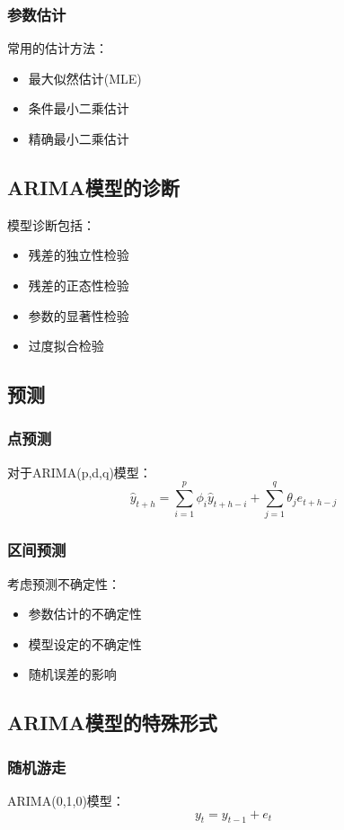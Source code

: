 \subsubsection{参数估计}
常用的估计方法：
\begin{itemize}
    \item 最大似然估计(MLE)
    \item 条件最小二乘估计
    \item 精确最小二乘估计
\end{itemize}

\subsection{ARIMA模型的诊断}
模型诊断包括：
\begin{itemize}
    \item 残差的独立性检验
    \item 残差的正态性检验
    \item 参数的显著性检验
    \item 过度拟合检验
\end{itemize}

\subsection{预测}
\subsubsection{点预测}
对于ARIMA(p,d,q)模型：
\[\hat{y}_{t+h} = \sum_{i=1}^p \phi_i \hat{y}_{t+h-i} + \sum_{j=1}^q \theta_j e_{t+h-j}\]

\subsubsection{区间预测}
考虑预测不确定性：
\begin{itemize}
    \item 参数估计的不确定性
    \item 模型设定的不确定性
    \item 随机误差的影响
\end{itemize}

\subsection{ARIMA模型的特殊形式}
\subsubsection{随机游走}
ARIMA(0,1,0)模型：
\[y_t = y_{t-1} + e_t\]

